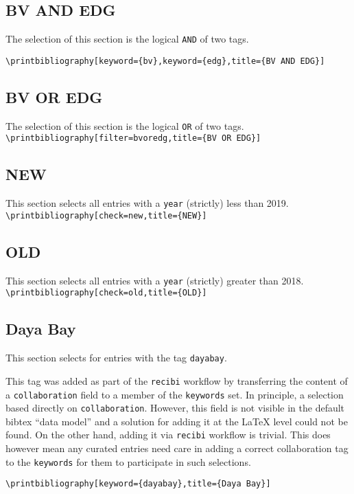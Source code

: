 \documentclass{article}
\begin{document}
\begin{refsection}
\section{BV AND EDG}
The selection of this section is the logical \texttt{AND} of two tags.

\nocite{*}
\noindent \verb|\printbibliography[keyword={bv},keyword={edg},title={BV AND EDG}]|
\printbibliography[keyword={bv},keyword={edg},title={BV AND EDG}]
\end{refsection}


\begin{refsection}
\section{BV OR EDG}
The selection of this section is the logical \texttt{OR} of two tags.
\nocite{*}
\noindent \verb|\printbibliography[filter=bvoredg,title={BV OR EDG}]|
\printbibliography[filter=bvoredg,title={BV OR EDG}]
\end{refsection}


\begin{refsection}
\section{NEW}
This section selects all entries with a \texttt{year} (strictly) less than 2019.
\nocite{*}
\noindent \verb|\printbibliography[check=new,title={NEW}]|
\printbibliography[check=new,title={NEW}]
\end{refsection}


\begin{refsection}
\section{OLD}
This section selects all entries with a \texttt{year} (strictly) greater than 2018.
\nocite{*}
\noindent \verb|\printbibliography[check=old,title={OLD}]|
\printbibliography[check=old,title={OLD}]
\end{refsection}


\begin{refsection}
\section{Daya Bay}
This section selects for entries with the tag \texttt{dayabay}.

This tag was added as part of the \texttt{recibi} workflow by transferring the content of a \texttt{collaboration} field to a member of the \texttt{keywords} set.  In principle, a selection based directly on \texttt{collaboration}.  However, this field is not visible in the default bibtex ``data model'' and a solution for adding it at the \LaTeX{} level could not be found.  On the other hand, adding it via \texttt{recibi} workflow is trivial.  This does however mean any curated entries need care in adding a correct collaboration tag to the \texttt{keywords} for them to participate in such selections.

\nocite{*}
\noindent \verb|\printbibliography[keyword={dayabay},title={Daya Bay}]|
\printbibliography[keyword={dayabay},title={Daya Bay}]
\end{refsection}
\end{document}

